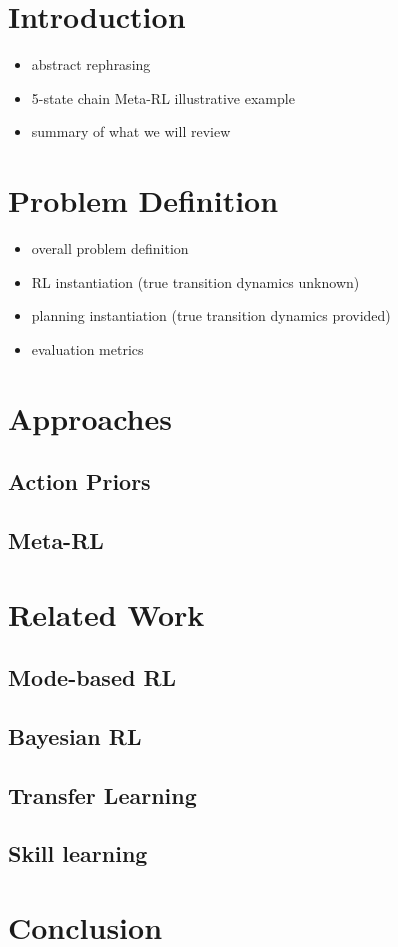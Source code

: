 \documentclass[11pt]{article} %
\begin{document}
\begin{abstract}
\end{abstract}




\startmain %

\section{Introduction}

\begin{itemize}
\item abstract rephrasing
\item 5-state chain Meta-RL illustrative example
\item summary of what we will review
\end{itemize}

\section{Problem Definition}
\begin{itemize}
\item overall problem definition
\item RL instantiation (true transition dynamics unknown)
\item planning instantiation (true transition dynamics provided)
\item evaluation metrics 
\end{itemize}

\section{Approaches}
\subsection{Action Priors}
\subsection{Meta-RL}

\section{Related Work}
\subsection{Mode-based RL}
\subsection{Bayesian RL}
\subsection{Transfer Learning}
\subsection{Skill learning}


\section{Conclusion}
\end{document}
